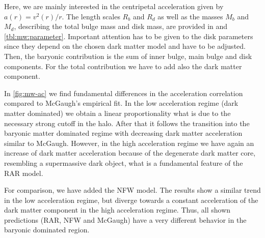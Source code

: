 Here, we are mainly interested in the centripetal acceleration given by $a(r) = v^2(r)/r$. The length scales $R_b$ and $R_d$ as well as the masses $M_b$ and $M_d$, describing the total bulge mass and disk mass, are provided in \citet{2013PASJ...65..118S} and \cref{tbl:mw:parameter}. Important attention has to be given to the disk parameters since they depend on the chosen dark matter model and have to be adjusted. Then, the baryonic contribution is the sum of inner bulge, main bulge and disk components. For the total contribution we have to add also the dark matter component.


In \cref{fig:mw-ac} we find fundamental differences in the acceleration correlation compared to McGaugh's empirical fit. In the low acceleration regime (dark matter dominated) we obtain a linear proportionality what is due to the necessary strong cutoff in the halo. After that it follows the transition into the baryonic matter dominated regime with decreasing dark matter acceleration similar to McGaugh. However, in the high acceleration regime we have again an increase of dark matter acceleration because of the degenerate dark matter core, resembling a supermassive dark object, what is a fundamental feature of the RAR model.

For comparison, we have added the NFW model. The results show a similar trend in the low acceleration regime, but diverge towards a constant acceleration of the dark matter component in the high acceleration regime. Thus, all shown predictions (RAR, NFW and McGaugh) have a very different behavior in the baryonic dominated region.